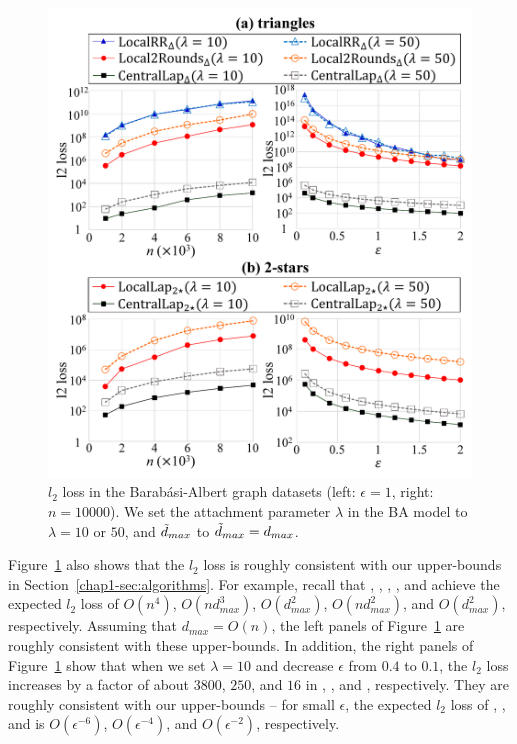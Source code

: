 \begin{figure}[t]
\centering
\includegraphics[width=0.99\linewidth]{fig/res6_BAGraph.pdf}

\caption{$l_2$ loss in the Barab\'{a}si-Albert graph datasets 
(left: $\epsilon=1$, right: $n=10000$). 
We set the attachment parameter $\lambda$ in the BA model to $\lambda=10$ or $50$, and $\tilde{d}_{max}$ to $\tilde{d}_{max} = d_{max}$.}
\label{chap1-fig:res6_BAGraph}
\end{figure}

Figure~\ref{chap1-fig:res6_BAGraph} also shows that the $l_2$ loss is roughly consistent with our upper-bounds in Section~\ref{chap1-sec:algorithms}. 
For example, recall that , , , , and  achieve the expected $l_2$ loss of $O(n^4)$, $O(nd_{max}^3)$, $O(d_{max}^2)$, $O(nd_{max}^{2})$, and $O(d_{max}^{2})$, respectively. 
Assuming that $d_{max} = O(n)$, the left panels of Figure~\ref{chap1-fig:res6_BAGraph} are roughly consistent with these upper-bounds. 
In addition, the right panels of Figure~\ref{chap1-fig:res6_BAGraph} show that when we set $\lambda=10$ and decrease $\epsilon$ from $0.4$ to $0.1$, the $l_2$ loss increases by a factor of about $3800$, $250$, and $16$ in , , and , respectively. 
They are roughly consistent with our upper-bounds -- for small $\epsilon$, the expected $l_2$ loss of , , and  is  $O(\epsilon^{-6})$, $O(\epsilon^{-4})$, and $O(\epsilon^{-2})$, respectively.

